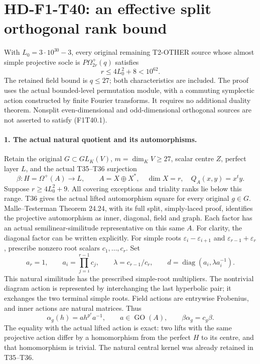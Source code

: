 \section[HD-F1-T40: a split orthogonal rank cutoff]{HD-F1-T40: an effective split orthogonal rank bound}
\label{sec:f1-split-orthogonal-rank-cutoff}

With \(L_0=3\cdot10^{30}-3\), every original remaining
T2-OTHER source whose almost simple projective socle is
\(P\Omega^+_{2r}(q)\) satisfies
\[
 \boxed{\qquad r\le4L_0^2+8<10^{62}.\qquad}
 \tag{F1T40.1}
\]
The retained field bound is \(q\le27\); both characteristics
are included. The proof uses the actual bounded-level
permutation module, with a commuting symplectic action
constructed by finite Fourier transforms. It requires no
additional duality theorem. Nonsplit even-dimensional and
odd-dimensional orthogonal sources are not asserted to satisfy
(F1T40.1).

\paragraph{1. The actual natural quotient and its automorphisms.}
Retain the original \(G\subset GL_K(V)\),
\(m=\dim_KV\ge27\), scalar centre \(Z\), perfect layer
\(L\), and the actual T35--T36 surjection
\[
 \beta:H=\Omega^+(A)\longrightarrow L,
 \qquad A=X\oplus X^*,\quad\dim X=r,
 \quad Q_A(x,y)=x^ty.
 \tag{F1T40.2}
\]
Suppose \(r\ge4L_0^2+9\). All covering exceptions and
triality ranks lie below this range. T36 gives the actual
lifted automorphism square for every original \(g\in G\).
Malle--Testerman Theorem 24.24, with its full split,
simply-laced proof, identifies the projective automorphism
as inner, diagonal, field and graph. Each factor has an
actual semilinear-similitude representative on this same \(A\).
For clarity, the diagonal factor can be written explicitly.
For simple roots
\(\varepsilon_i-\varepsilon_{i+1}\) and
\(\varepsilon_{r-1}+\varepsilon_r\), prescribe nonzero
root scalars \(c_1,\ldots,c_r\). Set
\[
 a_r=1,\qquad a_i=\prod_{j=i}^{r-1}c_j,
 \qquad\lambda=c_{r-1}/c_r,
 \qquad d=\operatorname{diag}(a_i,\lambda a_i^{-1}).
 \tag{F1T40.3}
\]
This natural similitude has the prescribed simple-root
multipliers. The nontrivial diagram action is represented
by interchanging the last hyperbolic pair; it exchanges
the two terminal simple roots. Field actions are entrywise
Frobenius, and inner actions are natural matrices. Thus
\[
 \alpha_g(h)=a h^{p^e}a^{-1},\qquad
 a\in\operatorname{GO}(A),\qquad
 \beta\alpha_g=c_g\beta.
 \tag{F1T40.4}
\]
The equality with the actual lifted action is exact: two
lifts with the same projective action differ by a
homomorphism from the perfect \(H\) to its centre, and
that homomorphism is trivial. The natural central kernel
was already retained in T35--T36.

